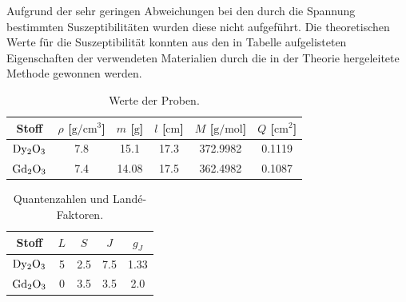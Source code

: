 Aufgrund der sehr geringen Abweichungen bei den durch die Spannung bestimmten Suszeptibilitäten
wurden diese nicht aufgeführt. Die theoretischen Werte für die Suszeptibilität konnten aus den 
in Tabelle aufgelisteten Eigenschaften der verwendeten Materialien durch die in der Theorie 
hergeleitete Methode gewonnen werden.

\begin{table}[H]
  \centering
  \caption{Werte der Proben.}
  \label{tab:Proben}
  \begin{tabular}{c c c c c c }
    \toprule
    {Stoff} & {$\rho$ [$\si{\gram\per\centi\metre\cubed}$]} & {$m$ [$\si{\gram}$]} & {$l$ [$\si{\centi\metre}$]} & {$M$ [$\si{\gram\per\mole}$]} & {$Q$ [$\si{\centi\metre\squared}$]}\\
    \midrule
    $\ce{Dy2O3}$ & 7.8 & 15.1 & 17.3 & 372.9982 & 0.1119\\
    $\ce{Gd2O3}$ & 7.4 & 14.08 & 17.5 & 362.4982 & 0.1087\\
    \bottomrule
  \end{tabular}
\end{table}

\begin{table}[H]
  \centering
  \caption{Quantenzahlen und Landé-Faktoren.}
  \begin{tabular}{c c c c c }
    \toprule
    {Stoff} & {$L$} & {$S$} & {$J$} & {$g_J$}\\
    \midrule
    $\ce{Dy2O3}$ & 5 & 2.5 & 7.5 & 1.33\\
    $\ce{Gd2O3}$ & 0 & 3.5 & 3.5 & 2.0\\
    \bottomrule
  \end{tabular}
\end{table}

